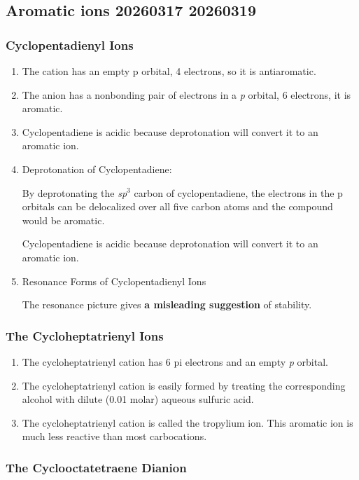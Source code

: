 \subsection{Aromatic ions 20260317 20260319}

\subsubsection{Cyclopentadienyl Ions}

\begin{enumerate}
    \item The cation has an empty p orbital, 4 electrons, so it is antiaromatic.
    \item The anion has a nonbonding pair of electrons in a \textit{p} orbital, 6 electrons, it is aromatic.
    \item Cyclopentadiene is acidic because deprotonation will convert it to an aromatic ion.
    \item Deprotonation of Cyclopentadiene: 
    
    By deprotonating the \textit{sp}$^3$ carbon of cyclopentadiene, the electrons in the p orbitals can be delocalized over all five carbon atoms and the compound would be aromatic.
    
    Cyclopentadiene is acidic because deprotonation will convert it to an aromatic ion.
    \item Resonance Forms of Cyclopentadienyl Ions
    
    The resonance picture gives \textbf{a misleading suggestion} of stability.
\end{enumerate}

\subsubsection{The Cycloheptatrienyl Ions}

\begin{enumerate}
    \item The cycloheptatrienyl cation has 6 pi electrons and an empty \textit{p} orbital. 
    \item The cycloheptatrienyl cation is easily formed by treating the corresponding alcohol with dilute (0.01 molar) aqueous sulfuric acid.
    \item The cycloheptatrienyl cation is called the tropylium ion. This aromatic ion is much less reactive than most carbocations.
\end{enumerate}

\subsubsection{The Cyclooctatetraene Dianion}

